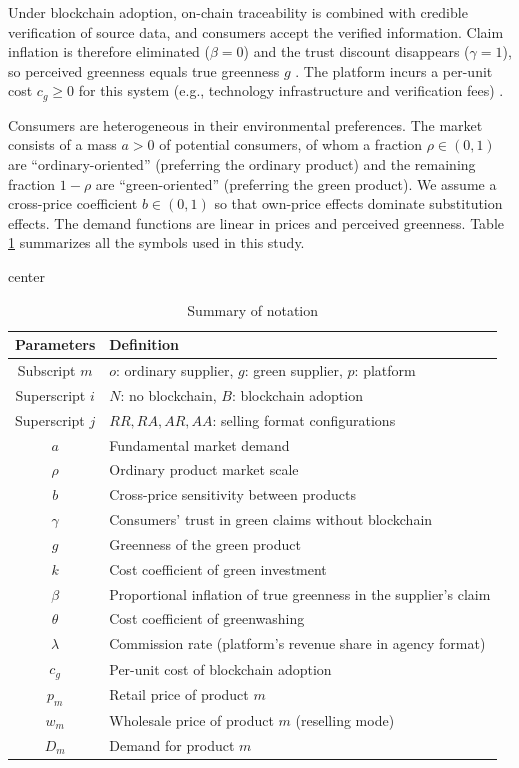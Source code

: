 \documentclass[preprint,review,12pt,authoryear,nopreprintline]{elsarticle}
\theoremstyle{definition}
\begin{document}
Under blockchain adoption, on-chain traceability is combined with credible verification of source data, and consumers accept the verified information. Claim inflation is therefore eliminated ($\beta = 0$) and the trust discount disappears ($\gamma = 1$), so perceived greenness equals true greenness $g$ \citep{shen2022combat,wu2024blockchain}. The platform incurs a per-unit cost $c_g \geq 0$ for this system (e.g., technology infrastructure and verification fees) \citep{wu2025platform}.

Consumers are heterogeneous in their environmental preferences. The market consists of a mass $a>0$ of potential consumers, of whom a fraction $\rho \in (0,1)$ are ``ordinary-oriented'' (preferring the ordinary product) and the remaining fraction $1 - \rho$ are ``green-oriented'' (preferring the green product). We assume a cross-price coefficient $b\in(0,1)$ so that own-price effects dominate substitution effects. The demand functions are linear in prices and perceived greenness. Table \ref{tab:notation} summarizes all the symbols used in this study.

\begin{table}[ht!]
\caption{Summary of notation}
\begin{adjustbox}{center}
{\begin{tabular}{c l}
\hline
Parameters & Definition \\
\hline
Subscript $m$ & $o$: ordinary supplier, $g$: green supplier, $p$: platform\\
Superscript $i$ & $N$: no blockchain, $B$: blockchain adoption \\
Superscript $j$ & $RR, RA, AR, AA$: selling format configurations \\
$a$ & Fundamental market demand\\
$\rho$ & Ordinary product market scale \\
 $b$ & Cross-price sensitivity between products \\
 $\gamma$ & Consumers' trust in green claims without blockchain \\
 $g$ & Greenness of the green product \\
 $k$ & Cost coefficient of green investment\\
 $\beta$ & Proportional inflation of true greenness in the supplier's claim \\
   $\theta$ & Cost coefficient of greenwashing\\
 $\lambda$ & Commission rate (platform's revenue share in agency format)\\
 $c_g$ & Per-unit cost of blockchain adoption\\
 $p_m$ & Retail price of product $m$ \\
 $w_m$ & Wholesale price of product $m$ (reselling mode) \\
 $D_m$ & Demand for product $m$ \\
 \hline
    \end{tabular}}
    \end{adjustbox}
   \label{tab:notation}
\end{table}
\end{document}
